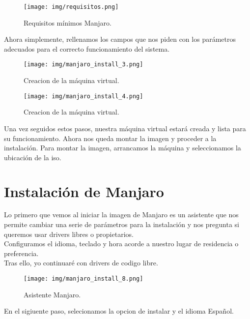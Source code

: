 \documentclass[12pt]{article}
\begin{document}
      \begin{figure}[h]
        \centering
        \texttt{[image: img/requisitos.png]}
        \caption{Requisitos mínimos Manjaro.}
        \label{requisitos}
      \end{figure}

      \newpage

      Ahora simplemente, rellenamos los campos que nos piden con los parámetros adecuados para el correcto 
      funcionamiento del sistema.

      \begin{figure}[h]
        \centering
        \texttt{[image: img/manjaro\_install\_3.png]}
        \caption{Creacion de la máquina virtual.}
        \label{Manjaro2}
      \end{figure}

      \begin{figure}[h]
        \centering
        \texttt{[image: img/manjaro\_install\_4.png]}
        \caption{Creacion de la máquina virtual.}
        \label{Manjaro3}
      \end{figure}
    
      Una vez seguidos estos pasos, nuestra máquina virtual estará creada y lista para su funcionamiento. Ahora 
      nos queda montar la imagen y proceder a la instalación. Para montar la imagen, arrancamos la máquina y seleccionamos 
      la ubicación de la iso.

      \newpage

      \section{Instalación de Manjaro}
        Lo primero que vemos al iniciar la imagen de Manjaro es un asistente que nos permite cambiar una serie de parámetros 
        para la instalación y nos pregunta si queremos usar drivers libres o propietarios.\\
        Configuramos el idioma, teclado y hora acorde a nuestro lugar de residencia o preferencia.\\
        Tras ello, yo continuaré con drivers de codigo libre.

        \begin{figure}[h]
          \centering
          \texttt{[image: img/manjaro\_install\_8.png]}
          \caption{Asistente Manjaro.}
          \label{Manjaro4}
        \end{figure}

        En el sigiuente paso, selecionamos la opcion de instalar y el idioma Español.
\end{document}
